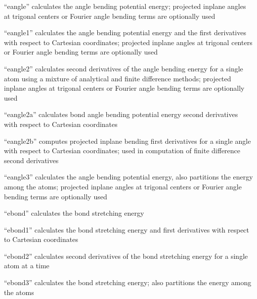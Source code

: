 \documentclass[letterpaper,11pt,english]{sphinxmanual}
\begin{document}
“eangle” calculates the angle bending potential energy; projected in\sphinxhyphen{}plane angles at trigonal centers or Fourier angle bending terms are optionally used


“eangle1” calculates the angle bending potential energy and the first derivatives with respect to Cartesian coordinates; projected in\sphinxhyphen{}plane angles at trigonal centers or Fourier angle bending terms are optionally used


“eangle2” calculates second derivatives of the angle bending energy for a single atom using a mixture of analytical and finite difference methods; projected in\sphinxhyphen{}plane angles at trigonal centers or Fourier angle bending terms are optionally used


“eangle2a” calculates bond angle bending potential energy second derivatives with respect to Cartesian coordinates


“eangle2b” computes projected in\sphinxhyphen{}plane bending first derivatives for a single angle with respect to Cartesian coordinates; used in computation of finite difference second derivatives


“eangle3” calculates the angle bending potential energy, also partitions the energy among the atoms; projected in\sphinxhyphen{}plane angles at trigonal centers or Fourier angle bending terms are optionally used


“ebond” calculates the bond stretching energy


“ebond1” calculates the bond stretching energy and first derivatives with respect to Cartesian coordinates


“ebond2” calculates second derivatives of the bond stretching energy for a single atom at a time


“ebond3” calculates the bond stretching energy; also partitions the energy among the atoms
\end{document}
